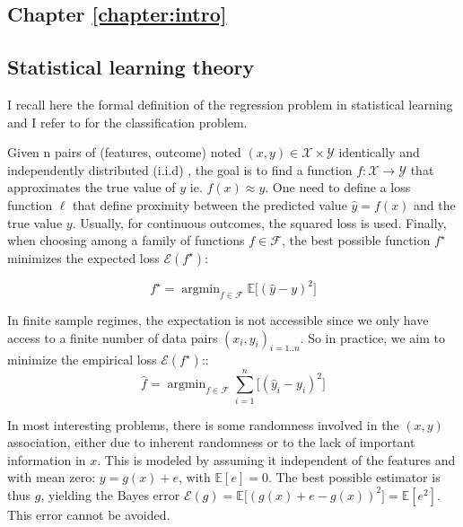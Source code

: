 \documentclass[french,12pt,twoside,a4paper]{book}
\newcommand{\highlight}[2]{\colorbox{#1!17}{$\displaystyle #2$}}
\renewcommand{\highlight}[2]{\colorbox{#1!17}{#2}}
\DeclareMathOperator*{\argmin}{argmin} \def\mycitecolor{green!50!black}
\let\fontnumber\relax
\renewcommand{\thesection}{\fontnumber{\color{chaptercolor}\arabic{chapter}.}\arabic{section}}
\renewcommand{\thesubsection}{\fontnumber{\color{chaptercolor}\arabic{chapter}.}\arabic{section}.\arabic{subsection}}
\begin{document}
\clearpage
\begin{appendices}
  \renewcommand{\thechapter}{\Alph{chapter}} %
  \renewcommand{\thesection}{\thechapter.\arabic{section}} %
  \renewcommand{\thesubsection}{\thesection.\arabic{subsection}} %

  \chapter{Chapter \ref{chapter:intro}}\label{apd:intro}

  \section{Statistical learning theory}\label{apd:intro:statistical_learning}

  I recall here the formal definition of the regression problem in statistical
  learning and I refer to \cite{hastie2009elements} for the classification
  problem.

  Given n pairs of (features,
  outcome) noted $(x, y) \in \mathcal X \times \mathcal{Y}$ identically and
  independently distributed (i.i.d) , the goal is to find a function $f:
    \mathcal{X} \rightarrow \mathcal{Y}$ that approximates the true value of $y$
  ie. $f(x) \approx y$. One need to define a loss function $\ell$ that define
  proximity between the predicted value $\hat{y} = f(x)$ and the true value
  $y$. Usually, for continuous outcomes, the squared loss is used. Finally,
  when choosing among a family of functions $f \in \mathcal{F}$, the best possible function $f^{\star}$
  minimizes the expected loss $\mathcal{E}(f^{\star})$:

  \begin{equation}
    f^{\star} = \argmin_{f \in \mathcal{F}} \mathbb{E} \big [ (\hat{y} - y)^2 \big]
  \end{equation}

  In finite sample regimes, the expectation is not accessible since we only have
  access to a finite number of data pairs ${(x_i, y_i)}_{i=1..n}$. So in
  practice, we aim to minimize the empirical loss $\mathcal{E}(f^{\star})$::
  \begin{equation}
    \hat f = \argmin_{f \in \mathcal{F}} \sum_{i=1}^{n} \big [ (\hat{y}_{i} - y_{i})^2 \big]
  \end{equation}

  In most interesting problems, there is some randomness involved in the $(x,y)$
  association, either due to inherent randomness or to the lack of important
  information in $x$. This is modeled by assuming it independent of the features
  and with mean zero: $y = g(x) + e$, with $\mathbb E[e]=0$. The best possible estimator
  is thus $g$, yielding the Bayes error \highlight{bayes_error}{\color{black} $\mathcal{E}(g) =
      \mathbb{E} \big [ (g(x) + e - g(x))^2 \big]=\mathbb{E}[e^2]$}. This error
  cannot be avoided.


\end{appendices}
\end{document}
